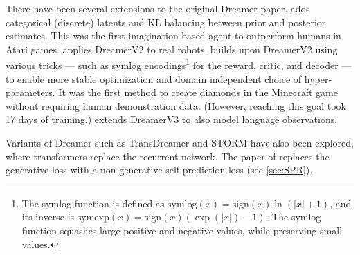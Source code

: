 
There have been several extensions to the original Dreamer paper.
 \citep{dreamerv2}
adds categorical (discrete) latents and  KL balancing between prior
and posterior estimates.  
This was the
first imagination-based agent to outperform humans in Atari games.
 \citep{dayDreamer}
applies DreamerV2 to real robots.
 \citep{dreamerv3}
builds upon DreamerV2 using various tricks --- such as symlog
encodings\footnote{
%
The symlog function is defined as
$\text{symlog}(x) = \text{sign}(x)\ln(|x|+1)$,
and its inverse is
$\text{symexp}(x) = \text{sign}(x)(\exp(|x|)-1)$.
The symlog function squashes large positive and negative values,
while preserving small values.
} %
for the reward, critic, and decoder ---
to enable more stable optimization and domain independent
choice of hyper-parameters.
It was the first method to create diamonds in the Minecraft
game without requiring human demonstration data.
(However, reaching this goal took 17 days of training.)
\citep{Lin2024} extends DreamerV3 to also model language
observations.


Variants of Dreamer such as TransDreamer \citep{transDreamer}
 and STORM \citep{storm}  have also been
 explored, where transformers replace the recurrent network.
The   paper of \citep{dreamingV2}
replaces the generative loss
with a non-generative self-prediction loss (see \cref{sec:SPR}).

